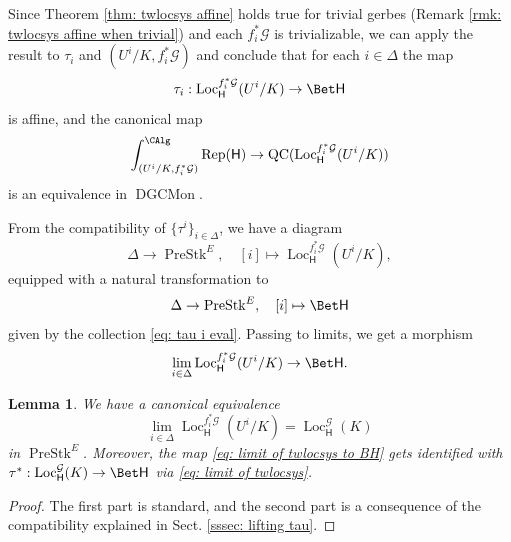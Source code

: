 \documentclass[10pt]{amsart}
\newcommand{\sssec}{\subsubsection}
\newtheorem{lemma}[subsubsection]{Lemma}
\theoremstyle{remark}
\newcommand{\on}{\operatorname}
\newcommand{\cG}{\mathcal{G}}
\newcommand{\DGCatSymMon}{\on{DGCMon}}
\newcommand{\Rep}{\on{Rep}}
\newcommand{\QC}{\on{QC}}
\newcommand{\Loc}{\on{Loc}}
\newcommand{\PreStk}{\on{PreStk}}
\newcommand{\sffH}{\mathsf{H}}
\begin{document}
\sssec{}
Since Theorem \ref{thm: twlocsys affine} holds true for trivial gerbes (Remark \ref{rmk: twlocsys affine when trivial}) and each $f^*_i\cG$ is trivializable, we can apply the result to $\tau_i$ and $(U^i/K,f^*_i\cG)$ and conclude that for each $i\in\Delta$
 the map
    \begin{equation}\label{eq: tau i eval}
        \tau_i:\Loc^{f^*_i\cG}_\sffH (U^i/K)\rightarrow \Bet \sffH
    \end{equation}
    is affine,
    and the canonical map
    \begin{equation}\label{eq: equivalence for pullbacks}
        \int^{\CAlg}_{(U^i/K,f^*_i\cG)}\Rep(\sffH)\rightarrow \QC(\Loc^{f^*_i\cG}_\sffH (U^i/K))
    \end{equation}
    is an equivalence in $\DGCatSymMon$.
\medskip

From the compatibility of $\{\tau^i\}_{i\in\Delta}$, we have a diagram
\begin{equation}\label{eq: diagram twlocsys}
    \Delta\rightarrow \PreStk^E,\quad [i]\mapsto \Loc^{f^*_i\cG}_\sffH (U^i/K),
\end{equation}
equipped with a natural transformation to
\begin{equation*}\label{eq: diagram const BH}
    \Delta\rightarrow \PreStk^E,\quad [i]\mapsto \Bet \sffH
\end{equation*}
given by the collection \eqref{eq: tau i eval}. Passing to limits, we get a morphism
\begin{equation}\label{eq: limit of twlocsys to BH}
    \lim_{i\in\Delta}\Loc^{f^*_i\cG}_\sffH (U^i/K)\rightarrow \Bet \sffH.
\end{equation}

\begin{lemma}\label{lem: limit of twlocsys}
    We have a canonical equivalence
    \begin{equation}\label{eq: limit of twlocsys}
        \lim_{i\in\Delta}\Loc^{f^*_i\cG}_\sffH (U^i/K)=\Loc^{\cG}_\sffH(K)
    \end{equation}
    in $\PreStk^E$. Moreover, the map \eqref{eq: limit of twlocsys to BH} gets identified with
    $\tau^*:\Loc^{\cG}_\sffH(K)\rightarrow \Bet \sffH$
    via \eqref{eq: limit of twlocsys}.
\end{lemma}
\begin{proof}
    The first part is standard, and the second part is a consequence of the compatibility explained in Sect. \ref{sssec: lifting tau}.
\end{proof}
\end{document}

